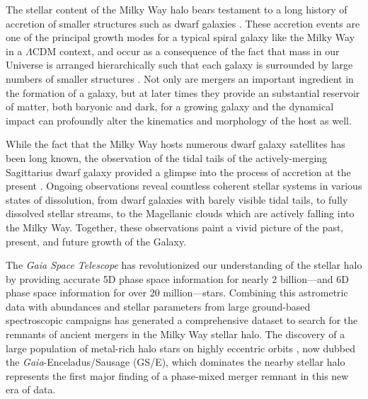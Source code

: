 The stellar content of the Milky Way halo bears testament to a long history of accretion of smaller structures such as dwarf galaxies \parencite{helmi20,deason24}. These accretion events are one of the principal growth modes for a typical spiral galaxy like the Milky Way in a $\Lambda$CDM context, and occur as a consequence of the fact that mass in our Universe is arranged hierarchically such that each galaxy is surrounded by large numbers of smaller structures \parencite{white78,searle78}. Not only are mergers an important ingredient in the formation of a galaxy, but at later times they provide an substantial reservoir of matter, both baryonic and dark, for a growing galaxy and the dynamical impact can profoundly alter the kinematics and morphology of the host as well. 

While the fact that the Milky Way hosts numerous dwarf galaxy satellites has been long known, the observation of the tidal tails of the actively-merging Sagittarius dwarf galaxy provided a glimpse into the process of accretion at the present \parencite{ibata94,belokurov06}. Ongoing observations reveal countless coherent stellar systems in various states of dissolution, from dwarf galaxies with barely visible tidal tails, to fully dissolved stellar streams, to the Magellanic clouds which are actively falling into the Milky Way. Together, these observations paint a vivid picture of the past, present, and future growth of the Galaxy.

The \textit{Gaia Space Telescope} \parencite{gaia} has revolutionized our understanding of the stellar halo by providing accurate 5D phase space information for nearly 2 billion---and 6D phase space information for over 20 million---stars. Combining this astrometric data with abundances and stellar parameters from large ground-based spectroscopic campaigns has generated a comprehensive dataset to search for the remnants of ancient mergers in the Milky Way stellar halo. The discovery of a large population of metal-rich halo stars on highly eccentric orbits \parencite{belokurov18,haywood18,helmi18}, now dubbed the \textit{Gaia}-Enceladus/Sausage (GS/E), which dominates the nearby stellar halo represents the first major finding of a phase-mixed merger remnant in this new era of data.

